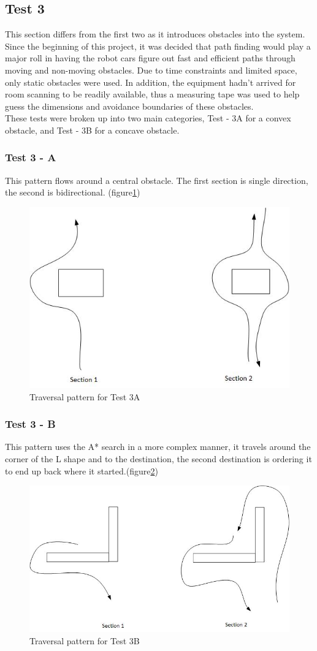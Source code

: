 \documentclass[10pt,a4paper]{article}
\begin{document}
	\subsection*{Test 3}
	This section differs from the first two as it introduces obstacles into the system. Since the beginning of this project, it was decided that path finding would play a major roll in having the robot cars figure out fast and efficient paths through moving and non-moving obstacles. Due to time constraints and limited space, only static obstacles were used. In addition, the equipment hadn't arrived for room scanning to be readily available, thus a measuring tape was used to help guess the dimensions and avoidance boundaries of these obstacles.
	\\
	These tests were broken up into two main categories, Test - 3A for a convex obstacle, and Test - 3B for a concave obstacle.
	
	\subsubsection*{Test 3 - A}
	This pattern flows around a central obstacle. The first section is single direction, the second is bidirectional. (figure\ref{fig:convex_travesal})
		\begin{figure}
			\centering
			\includegraphics[width=.6\textwidth]{convex_traversals.jpg}
			\caption{Traversal pattern for Test 3A}
			\label{fig:convex_travesal}
		\end{figure}
	\subsubsection*{Test 3 - B}
	This pattern uses the A* search in a more complex manner, it travels around the corner of the L shape and to the destination, the second destination is ordering it to end up back where it started.(figure\ref{fig:concave_travesal})
		\begin{figure}
			\centering
			\includegraphics[width=.6\textwidth]{concave_traversals.jpg}
			\caption{Traversal pattern for Test 3B}
			\label{fig:concave_travesal}
		\end{figure}
	
\end{document}
